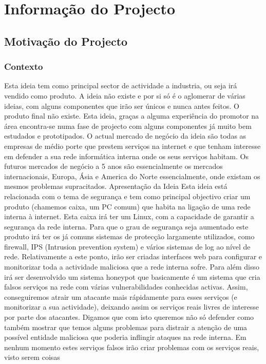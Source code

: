 \chapter{Informação do Projecto}
\section{Motivação do Projecto}
\subsection{Contexto}
Esta ideia tem como principal sector de actividade a industria, ou seja irá vendido como produto. A ideia não
existe e por si só é o aglomerar de várias ideias, com alguns componentes que irão ser únicos e nunca antes feitos.
O produto final não existe. Esta ideia, graças a alguma experiência do promotor na área encontra-se numa fase de
projecto com alguns componentes já muito bem estudados e prototipados.
O actual mercado de negócio da ideia são todas as empresas de médio porte que prestem serviços na internet e que
tenham interesse em defender a sua rede informática interna onde os seus serviços habitam.
Os futuros mercados de negócio a 5 anos são essencialmente os mercados internacionais, Europa, Ásia e America
do Norte essencialmente, onde existam os mesmos problemas supracitados.
Apresentação da Ideia
Esta ideia está relacionada com o tema de segurança e tem como principal objectivo criar um produto (chamemos
caixa, um PC comum) que habita na ligação de uma rede interna à internet. Esta caixa irá ter um Linux, com a
capacidade de garantir a segurança da rede interna. Para que o grau de segurança seja aumentado este produto irá
ter os já comuns sistemas de protecção largamente utilizados, como firewall, IPS (Intrusion prevention system) e
vários sistemas de log ao nível de rede. Relativamente a este ponto, irão ser criadas interfaces web para configurar
e monitorizar toda a actividade maliciosa que a rede interna sofre.
Para além disso irá ser desenvolvido um sistema honeypot que basicamente é um sistema que cria falsos serviços
na rede com várias vulnerabilidades conhecidas activas. Assim, conseguiremos atrair um atacante mais
rápidamente para esses serviços (e monitorizar a sua actividade), deixando assim os serviços reais livres de
interesse por parte dos atacantes. Digamos que com isto queremos não só defender como também mostrar que
temos alguns problemas para distrair a atenção de uma possível entidade maliciosa que poderia inflingir ataques na
rede interna.
Em nenhum momento estes serviços falsos irão criar problemas com os serviços reais, visto serem coisas
